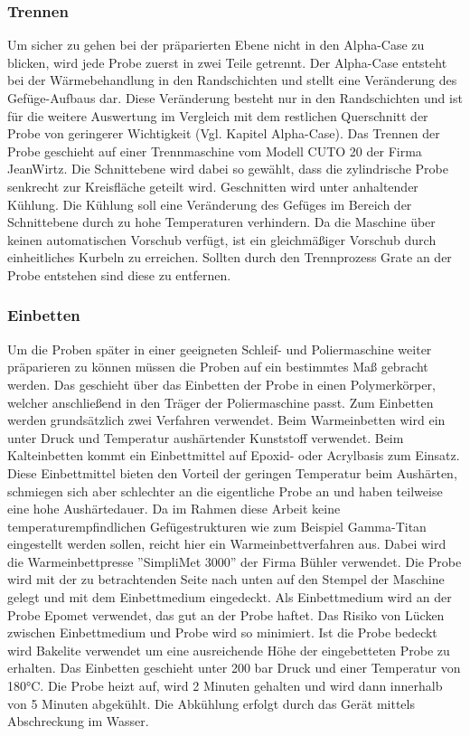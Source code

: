 \documentclass[a4paper, 11pt]{tubsreprt}
\begin{document}
\subsubsection{Trennen}
Um sicher zu gehen bei der präparierten Ebene nicht in den Alpha-Case zu  blicken, wird jede Probe zuerst in zwei Teile getrennt. Der Alpha-Case entsteht bei der Wärmebehandlung in den Randschichten und stellt eine Veränderung des Gefüge-Aufbaus dar. Diese Veränderung besteht nur in den Randschichten und ist für die weitere Auswertung im Vergleich mit dem restlichen Querschnitt der Probe von geringerer Wichtigkeit (Vgl. Kapitel Alpha-Case). Das Trennen der Probe geschieht auf einer Trennmaschine vom Modell CUTO 20 der Firma JeanWirtz. Die Schnittebene wird dabei so gewählt, dass die zylindrische Probe senkrecht zur Kreisfläche geteilt wird. Geschnitten wird unter anhaltender Kühlung. Die Kühlung soll eine Veränderung des Gefüges im Bereich der Schnittebene durch zu hohe Temperaturen verhindern. Da die Maschine über keinen automatischen Vorschub verfügt, ist ein gleichmäßiger Vorschub durch einheitliches Kurbeln zu erreichen. Sollten durch den Trennprozess Grate an der Probe entstehen sind diese zu entfernen.
\subsubsection{Einbetten}
Um die Proben später in einer geeigneten Schleif- und Poliermaschine weiter präparieren zu können müssen die Proben auf ein bestimmtes Maß gebracht werden. Das geschieht über das Einbetten der Probe in einen Polymerkörper, welcher anschließend in den Träger der Poliermaschine passt. Zum Einbetten werden grundsätzlich zwei Verfahren verwendet. Beim Warmeinbetten wird ein unter Druck und Temperatur aushärtender Kunststoff verwendet. Beim Kalteinbetten kommt ein Einbettmittel auf Epoxid- oder Acrylbasis zum Einsatz. Diese Einbettmittel bieten den Vorteil der geringen Temperatur beim Aushärten, schmiegen sich aber schlechter an die eigentliche Probe an und haben teilweise eine hohe Aushärtedauer. Da im Rahmen diese Arbeit keine temperaturempfindlichen Gefügestrukturen wie zum Beispiel Gamma-Titan eingestellt werden sollen, reicht hier ein Warmeinbettverfahren aus. Dabei wird die  Warmeinbettpresse ''SimpliMet 3000'' der Firma Bühler verwendet. Die Probe wird mit der zu betrachtenden Seite nach unten auf den Stempel der Maschine gelegt und mit dem Einbettmedium eingedeckt. Als Einbettmedium wird an der Probe Epomet verwendet, das gut an der Probe haftet. Das Risiko von Lücken zwischen Einbettmedium und Probe wird so minimiert. Ist die Probe bedeckt wird Bakelite verwendet um eine ausreichende Höhe der eingebetteten Probe zu erhalten. Das Einbetten geschieht unter 200 bar Druck und einer Temperatur von 180°C. Die Probe heizt auf, wird 2 Minuten gehalten und wird dann innerhalb von 5 Minuten abgekühlt. Die Abkühlung erfolgt durch das Gerät mittels Abschreckung im Wasser. 
\end{document}
